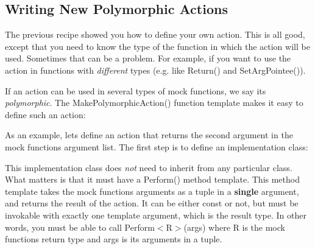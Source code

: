 \subsection*{Writing New Polymorphic Actions}

The previous recipe showed you how to define your own action. This is all good, except that you need to know the type of the function in which the action will be used. Sometimes that can be a problem. For example, if you want to use the action in functions with {\itshape different} types (e.\+g. like {\ttfamily Return()} and {\ttfamily Set\+Arg\+Pointee()}).

If an action can be used in several types of mock functions, we say it\textquotesingle{}s {\itshape polymorphic}. The {\ttfamily Make\+Polymorphic\+Action()} function template makes it easy to define such an action\+:


\begin{DoxyCode}{0}
\DoxyCodeLine{}
\DoxyCodeLine{}
\end{DoxyCode}


As an example, let\textquotesingle{}s define an action that returns the second argument in the mock function\textquotesingle{}s argument list. The first step is to define an implementation class\+:


\begin{DoxyCode}{0}
\DoxyCodeLine{  \}}
\DoxyCodeLine{\};}
\end{DoxyCode}


This implementation class does {\itshape not} need to inherit from any particular class. What matters is that it must have a {\ttfamily Perform()} method template. This method template takes the mock function\textquotesingle{}s arguments as a tuple in a {\bfseries{single}} argument, and returns the result of the action. It can be either {\ttfamily const} or not, but must be invokable with exactly one template argument, which is the result type. In other words, you must be able to call {\ttfamily Perform$<$R$>$(args)} where {\ttfamily R} is the mock function\textquotesingle{}s return type and {\ttfamily args} is its arguments in a tuple.

